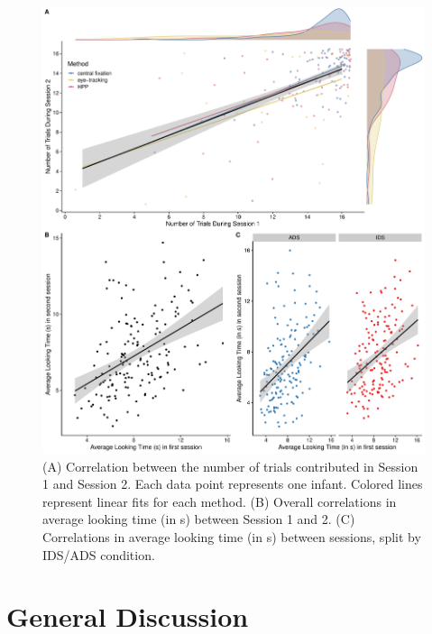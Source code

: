 \documentclass[
  man,floatsintext]{apa6}
\begin{document}
\begin{figure}

{\centering \includegraphics{Retest_current_draft_files/figure-latex/fig3-1} 

}

\caption{(A) Correlation between the number of trials contributed in Session 1 and Session 2. Each data point represents one infant. Colored lines represent linear fits for each method. (B) Overall correlations in average looking time (in s) between Session 1 and 2. (C) Correlations in average looking time (in s) between sessions, split by IDS/ADS condition.}\label{fig:fig3}
\end{figure}

\hypertarget{general-discussion}{%
\section{General Discussion}\label{general-discussion}}
\end{document}
